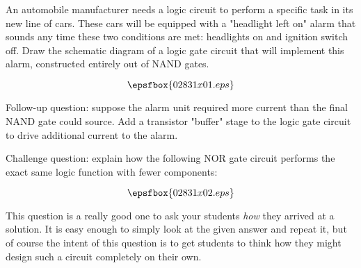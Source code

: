 

An automobile manufacturer needs a logic circuit to perform a specific task in its new line of cars.  These cars will be equipped with a "headlight left on" alarm that sounds any time these two conditions are met: headlights on and ignition switch off.  Draw the schematic diagram of a logic gate circuit that will implement this alarm, constructed entirely out of NAND gates.







$$\epsfbox{02831x01.eps}$$

\vskip 10pt

Follow-up question: suppose the alarm unit required more current than the final NAND gate could source.  Add a transistor "buffer" stage to the logic gate circuit to drive additional current to the alarm.

\vskip 10pt

Challenge question: explain how the following NOR gate circuit performs the exact same logic function with fewer components:

$$\epsfbox{02831x02.eps}$$







This question is a really good one to ask your students {\it how} they arrived at a solution.  It is easy enough to simply look at the given answer and repeat it, but of course the intent of this question is to get students to think how they might design such a circuit completely on their own.




